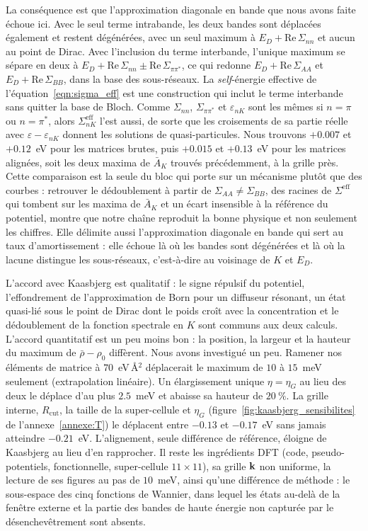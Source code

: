 La conséquence est que l'approximation diagonale en bande que nous avons faite échoue ici. Avec le seul terme intrabande, les deux bandes sont déplacées également et restent dégénérées, avec un seul maximum à $E_D+\mathrm{Re}\,\Sigma_{nn}$ et aucun au point de Dirac. Avec l'inclusion du terme interbande, l'unique maximum se sépare en deux à $E_D+\mathrm{Re}\,\Sigma_{nn}\pm\mathrm{Re}\,\Sigma_{\pi\pi^*}$, ce qui redonne $E_D+\mathrm{Re}\,\Sigma_{AA}$ et $E_D+\mathrm{Re}\,\Sigma_{BB}$, dans la base des sous-réseaux. La \textit{self}-énergie effective de l'équation~\eqref{eqn:sigma_eff} est une construction qui inclut le terme interbande sans quitter la base de Bloch. Comme $\Sigma_{nn}$, $\Sigma_{\pi\pi^*}$ et $\varepsilon_{nK}$ sont les mêmes si $n=\pi$ ou $n=\pi^*$, alors $\Sigma_{nK}^\text{eff}$ l'est aussi, de sorte que les croisements de sa partie réelle avec $\varepsilon-\varepsilon_{nK}$ donnent les solutions de quasi-particules. Nous trouvons $+0.007$ et $+0.12$~eV pour les matrices brutes, puis $+0.015$ et $+0.13$~eV pour les matrices alignées, soit les deux maxima de $\bar A_K$ trouvés précédemment, à la grille près. Cette comparaison est la seule du bloc qui porte sur un mécanisme plutôt que des courbes : retrouver le dédoublement à partir de $\Sigma_{AA}\neq\Sigma_{BB}$, des racines de $\Sigma^\text{eff}$ qui tombent sur les maxima de $\bar A_K$ et un écart insensible à la référence du potentiel, montre que notre chaîne reproduit la bonne physique et non seulement les chiffres. Elle délimite aussi l'approximation diagonale en bande qui sert au taux d'amortissement : elle échoue là où les bandes sont dégénérées et là où la lacune distingue les sous-réseaux, c'est-à-dire au voisinage de $K$ et $E_D$.

L'accord avec Kaasbjerg est qualitatif : le signe répulsif du potentiel, l'effondrement de l'approximation de Born pour un diffuseur résonant, un état quasi-lié sous le point de Dirac dont le poids croît avec la concentration et le dédoublement de la fonction spectrale en $K$ sont communs aux deux calculs. L'accord quantitatif est un peu moins bon : la position, la largeur et la hauteur du maximum de $\bar\rho-\rho_0$ diffèrent. Nous avons investigué un peu. Ramener nos éléments de matrice à $70$~eV\,\AA$^2$ déplacerait le maximum de $10$ à $15$~meV seulement (extrapolation linéaire). Un élargissement unique $\eta=\eta_G$ au lieu des deux le déplace d'au plus $2.5$~meV et abaisse sa hauteur de $20~\%$. La grille interne, $R_\text{cut}$, la taille de la super-cellule et $\eta_G$ (figure~\ref{fig:kaasbjerg_sensibilites} de l'annexe~\ref{annexe:T}) le déplacent entre $-0.13$ et $-0.17$~eV sans jamais atteindre $-0.21$~eV. L'alignement, seule différence de référence, éloigne de Kaasbjerg au lieu d'en rapprocher. Il reste les ingrédients DFT (code, pseudo-potentiels, fonctionnelle, super-cellule $11\times11$), sa grille $\mathbf{k}$ non uniforme, la lecture de ses figures au pas de $10$~meV, ainsi qu'une différence de méthode : le sous-espace des cinq fonctions de Wannier, dans lequel les états au-delà de la fenêtre externe et la partie des bandes de haute énergie non capturée par le désenchevêtrement sont absents.


